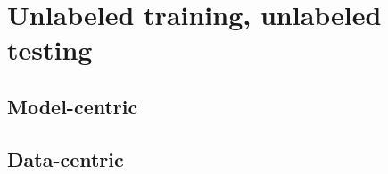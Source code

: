 \section{Unlabeled training, unlabeled testing}

\subsection{Model-centric}

\subsection{Data-centric}





























































































